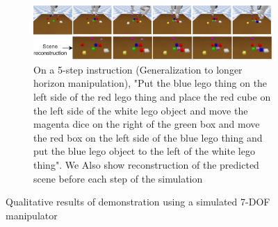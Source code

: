 \begin{figure}
    \vspace{1cm}

    \begin{subfigure}{\textwidth}
        \centering
        \includegraphics[width=\textwidth]{assets/qual-4.png}
        \caption{On a 5-step instruction (Generalization to longer horizon manipulation), \footnotesize{"Put the blue lego thing on the left side of the red lego thing and place the red cube on the left side of the white lego object and move the magenta dice on the right of the green box and move the red box on the left side of the blue lego thing and put the blue lego object to the left of the white lego thing"}. We Also show reconstruction of the predicted scene before each step of the simulation}
    \end{subfigure}
    
    \caption{Qualitative results of demonstration using a simulated 7-DOF manipulator}
    \label{fig:qual-1}
\end{figure}

